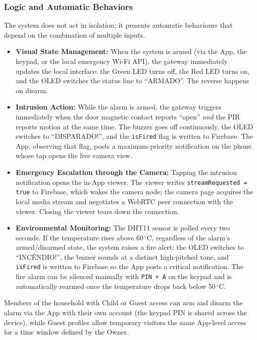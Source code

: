 \documentclass[10pt,twocolumn]{article}
\begin{document}
\subsubsection{Logic and Automatic Behaviors}
The system does not act in isolation; it presents automatic behaviours that depend on the combination of multiple inputs.
\begin{itemize}
    \item \textbf{Visual State Management:} When the system is armed (via the App, the keypad, or the local emergency Wi-Fi API), the gateway immediately updates the local interface: the Green LED turns off, the Red LED turns on, and the OLED switches the status line to ``ARMADO''. The reverse happens on disarm.
    \item \textbf{Intrusion Action:} While the alarm is armed, the gateway triggers immediately when the door magnetic contact reports ``open'' \emph{and} the PIR reports motion at the same time. The buzzer goes off continuously, the OLED switches to ``DISPARADO!'', and the \texttt{isFired} flag is written to Firebase. The App, observing that flag, posts a maximum-priority notification on the phone whose tap opens the live camera view.
    \item \textbf{Emergency Escalation through the Camera:} Tapping the intrusion notification opens the in-App viewer. The viewer writes \texttt{streamRequested = true} to Firebase, which wakes the camera node; the camera page acquires the local media stream and negotiates a WebRTC peer connection with the viewer. Closing the viewer tears down the connection.
    \item \textbf{Environmental Monitoring:} The DHT11 sensor is polled every two seconds. If the temperature rises above 60\,$^{\circ}$C, regardless of the alarm's armed/disarmed state, the system raises a fire alert: the OLED switches to ``INCÊNDIO!'', the buzzer sounds at a distinct high-pitched tone, and \texttt{isFired} is written to Firebase so the App posts a critical notification. The fire alarm can be silenced manually with \texttt{PIN + A} on the keypad and is automatically rearmed once the temperature drops back below 50\,$^{\circ}$C.
\end{itemize}

Members of the household with Child or Guest access can arm and disarm the alarm via the App with their own account (the keypad PIN is shared across the device), while Guest profiles allow temporary visitors the same App-level access for a time window defined by the Owner.
\end{document}
